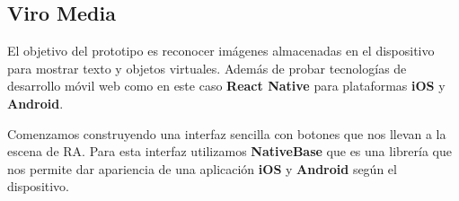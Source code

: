 \subsection{Viro Media} 
\label{makereference3.6.2}
\begin{flushleft}
El objetivo del prototipo es reconocer imágenes almacenadas en el dispositivo para mostrar texto y
 objetos virtuales. Además de probar tecnologías de desarrollo móvil web como en este caso \textbf{React Native}
 para plataformas \textbf{iOS} y \textbf{Android}.
\end{flushleft}
\begin{flushleft}
Comenzamos construyendo una interfaz sencilla con botones que nos llevan a la escena de RA.
Para esta interfaz utilizamos \textbf{NativeBase} que es una librería que nos permite
 dar apariencia de una aplicación \textbf{iOS} y \textbf{Android} según el dispositivo.
\end{flushleft}

